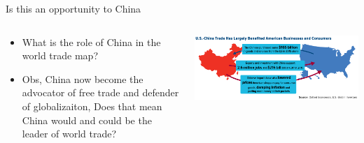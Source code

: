 \documentclass[10pt,hyperref={CJKbookmarks=true},xcolor=dvipsnames,aspectratio=43]{beamer}
\begin{document}
\begin{frame}{Is this an opportunity to China}


\begin{columns}[onlytextwidth]
\begin{column}{0.4\textwidth}
\begin{itemize}
\item What is the role of China in the world trade map?
\item Obs, China now become the advocator of free trade and defender of
globalizaiton, Does that mean China would and could be the leader
of world trade?
\end{itemize}

\end{column}
\begin{column}{0.6\textwidth}
\includegraphics[width=\columnwidth]{fig//trump5}
\end{column}
\end{columns}

\end{frame}
\end{document}
